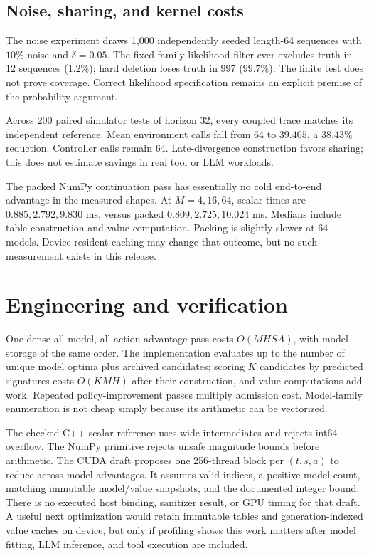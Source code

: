 \documentclass[10pt,twocolumn]{article}
\begin{document}
\subsection{Noise, sharing, and kernel costs}
The noise experiment draws 1,000 independently seeded length-64 sequences with
$10\%$ noise and $\delta=0.05$. The fixed-family likelihood filter ever excludes
truth in 12 sequences ($1.2\%$); hard deletion loses truth in 997 ($99.7\%$).
The finite test does not prove coverage. Correct likelihood specification remains
an explicit premise of the probability argument.

Across 200 paired simulator tests of horizon 32, every coupled trace matches its
independent reference. Mean environment calls fall from 64 to $39.405$, a $38.43\%$
reduction. Controller calls remain 64. Late-divergence construction favors sharing;
this does not estimate savings in real tool or LLM workloads.

The packed NumPy continuation pass has essentially no cold end-to-end advantage
in the measured shapes. At $M=4,16,64$, scalar times are $0.885,2.792,9.830$ ms,
versus packed $0.809,2.725,10.024$ ms. Medians include table construction and value
computation. Packing is slightly slower at 64 models. Device-resident caching may
change that outcome, but no such measurement exists in this release.

\section{Engineering and verification}
One dense all-model, all-action advantage pass costs $O(MHSA)$, with model storage
of the same order. The implementation evaluates up to the number of unique model
optima plus archived candidates; scoring $K$ candidates by predicted signatures
costs $O(KMH)$ after their construction, and value computations add work. Repeated
policy-improvement passes multiply admission cost. Model-family enumeration is
not cheap simply because its arithmetic can be vectorized.

The checked C++ scalar reference uses wide intermediates and rejects int64
overflow. The NumPy primitive rejects unsafe magnitude bounds before arithmetic.
The CUDA draft proposes one 256-thread block per $(t,s,a)$ to reduce across model
advantages. It assumes valid indices, a positive model count, matching immutable
model/value snapshots, and the documented integer bound. There is no executed
host binding, sanitizer result, or GPU timing for that draft. A useful next
optimization would retain immutable tables and generation-indexed value caches
on device, but only if profiling shows this work matters after model fitting,
LLM inference, and tool execution are included.
\end{document}
